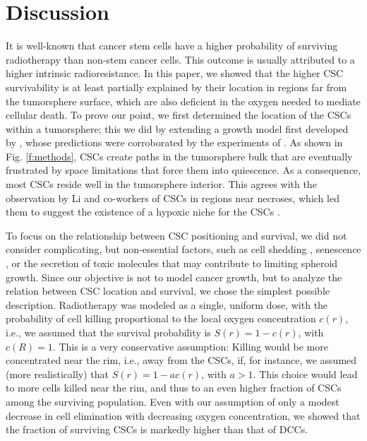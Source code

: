 \documentclass[10pt,letterpaper]{article}
\begin{document}
\section*{Discussion}

It is well-known that cancer stem cells have a higher probability of surviving radiotherapy than non-stem cancer cells. This outcome is usually attributed to a higher intrinsic radioresistance. In this paper, we showed that the higher CSC survivability is at least partially explained by their location in regions far from the tumorsphere surface, which are also deficient in the oxygen needed to mediate cellular death. To prove our point, we first determined the location of the CSCs within a tumorsphere; this we did by extending a growth model first developed by  \cite{barberisRadialPercolationReveals2021}, whose predictions were corroborated by the experiments of \cite{fotinos2024}. As shown in Fig. \ref{f:methods}, CSCs create paths in the tumorsphere bulk that are eventually frustrated by space limitations that force them into quiescence. As a consequence, most CSCs reside well in the tumorsphere interior. This agrees with the observation by Li and co-workers of CSCs in regions near necroses, which led them to suggest the existence of a hypoxic niche for the CSCs \cite{li2009}.

To focus on the relationship between CSC positioning and survival, we did not consider complicating, but non-essential factors, such as cell shedding \cite{menchon2009modeling}, senescence \cite{gao2013}, or the secretion of toxic molecules that may contribute to limiting spheroid growth. Since our objective is not to model cancer growth, but to analyze the relation between CSC location and survival, we chose the simplest possible description. Radiotherapy was modeled as a single, uniform dose, with the probability of cell killing proportional to the local oxygen concentration $c(r)$, i.e., we assumed that the survival probability is $S(r) = 1-c(r)$, with $c(R) = 1$. This is a very conservative assumption: Killing would be more concentrated near the rim, i.e., away from the CSCs, if, for instance, we assumed (more realistically) that $S(r)=1-ac(r)$, with $a > 1$. This choice would lead to more cells killed near the rim, and thus to an even higher fraction of CSCs among the surviving population. Even with our assumption of only a modest decrease in cell elimination with decreasing oxygen concentration, we showed that the fraction of surviving CSCs is markedly higher than that of DCCs.
\end{document}
